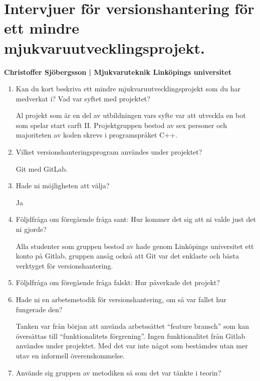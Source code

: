 \chapter{Intervjuer för versionshantering för ett mindre mjukvaruutvecklingsprojekt.}\label{appendix:bjorn}

\vspace{3em}
\begin{center}
    \textbf{Christoffer Sjöbergsson | Mjukvaruteknik Linköpings universitet}
\end{center}

\begin{enumerate}
    \item Kan du kort beskriva ett mindre mjukvaruutvecklingsprojekt som du har medverkat i? Vad var syftet med projektet?


    Al projekt som är en del av utbildningen vars syfte var att utveckla en bot som spelar start carft II. Projektgruppen bestod av sex personer och majoriteten av koden skrevs i programspråket C++.


    \item Vilket versionshanteringsprogram användes under projektet?

    Git med GitLab.

    \item Hade ni möjligheten att välja?

    Ja

    \item Följdfråga om föregående fråga sant: Hur kommer det sig att ni valde just det ni gjorde?

    Alla studenter som gruppen bestod av hade genom Linköpings universitet ett konto på Gitlab, gruppen ansåg också att Git var det enklaste och bästa verktyget för versionshantering.

    \item Följdfråga om föregående fråga falskt: Hur påverkade det projekt?

    \item Hade ni en arbetsmetodik för versionshantering, om så var fallet hur fungerade den?

    Tanken var från början att använda arbetssättet ``feature bransch'' som kan översättas till ``funktionalitets förgrening''. Ingen funktionalitet från Gitlab användes under projektet. Med det var inte något som bestämdes utan mer utav en informell överenskommelse.

    \item Använde sig gruppen av metodiken så som det var tänkte i teorin?


\end{enumerate}

